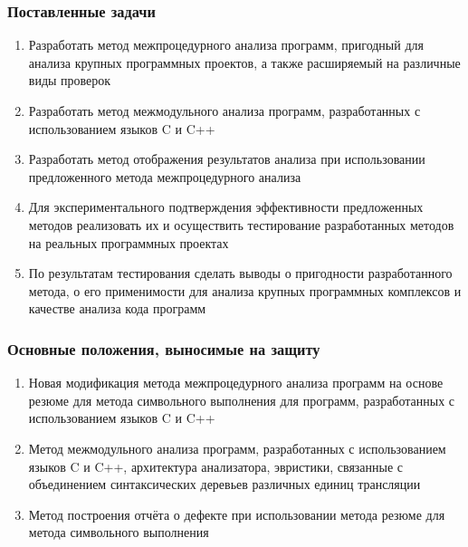 \documentclass[14pt]{beamer}
\begin{document}
\begin{frame}[allowframebreaks]
\frametitle{Поставленные задачи}
\begin{enumerate}
  \item Разработать метод межпроцедурного анализа программ, пригодный для анализа крупных программных проектов, а также расширяемый на различные виды проверок
  \item Разработать метод межмодульного анализа программ, разработанных с использованием языков C и C++
  \item Разработать метод отображения результатов анализа при использовании предложенного метода межпроцедурного анализа
  \item Для экспериментального подтверждения эффективности предложенных методов реализовать их и осуществить тестирование разработанных методов на реальных программных проектах
  \item По результатам тестирования сделать выводы о пригодности разработанного метода, о его применимости для анализа крупных программных комплексов и качестве анализа кода программ
\end{enumerate}
\end{frame}

\begin{frame}[allowframebreaks]
\frametitle{Основные положения, выносимые на защиту}
\begin{enumerate}
  \item Новая модификация метода межпроцедурного анализа программ на основе резюме для метода символьного выполнения для программ, разработанных с использованием языков C и C++
  \item Метод межмодульного анализа программ, разработанных с использованием языков C и C++, архитектура анализатора, эвристики, связанные с объединением синтаксических деревьев различных единиц трансляции
  \item Метод построения отчёта о дефекте при использовании метода резюме для метода символьного выполнения
\end{enumerate}
\end{frame}
\end{document}
